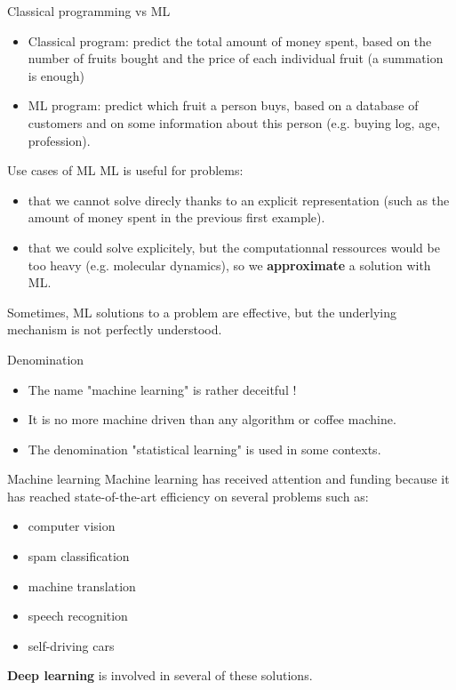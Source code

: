 \documentclass[usenames,dvipsnames]{beamer}
\begin{document}
\begin{frame}{Classical programming vs ML}
    \begin{itemize}
	\item Classical program: predict the total amount of money spent, based on the number of fruits bought and the price of each individual fruit (a summation is enough)
	\item ML program: predict which fruit a person buys, based on a database of customers and on some information about this person (e.g. buying log, age, profession).
    \end{itemize}
\end{frame}

\begin{frame}{Use cases of ML}
    ML is useful for problems:
\begin{itemize}
    \item that we cannot solve direcly thanks to an explicit representation (such as the amount of money spent in the previous first example).
    \item that we could solve explicitely, but the computationnal ressources would be too heavy (e.g. molecular dynamics), so we \textbf{approximate} a solution with ML.
\end{itemize}

Sometimes, ML solutions to a problem are effective, but the underlying mechanism is not perfectly understood.
\end{frame}

\begin{frame}{Denomination}
    \begin{itemize}
    	\item The name "machine learning" is rather deceitful !
	\item It is no more machine driven than any algorithm or coffee machine.
	\item The denomination "statistical learning" is used in some contexts.
    \end{itemize}
\end{frame}

\begin{frame}{Machine learning}
   Machine learning has received attention and funding because it has reached
    state-of-the-art efficiency on several problems such as:
    \begin{itemize}
        \item computer vision
        \item spam classification
        \item machine translation
        \item speech recognition
        \item self-driving cars
    \end{itemize}
    \textbf{{Deep learning}}  is involved in several of these solutions.
\end{frame}
\end{document}
